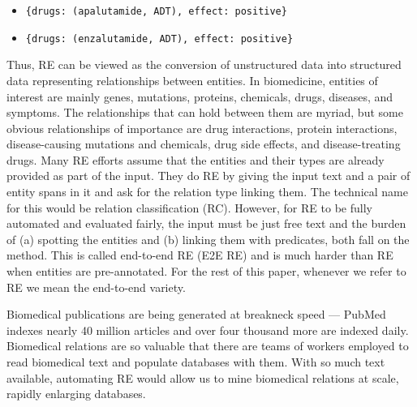\documentclass[11pt]{article}
\begin{document}
\noindent\parbox{\linewidth}{
\begin{itemize}
    \item \texttt{\{drugs: (apalutamide, ADT), effect: positive\}}
    \item \texttt{\{drugs: (enzalutamide, ADT), effect: positive\}}
\end{itemize}
} 

\noindent Thus, RE can be viewed as the conversion of unstructured data into structured data representing relationships between entities. 
In biomedicine, entities of interest are mainly genes, mutations, proteins, chemicals, drugs, diseases, and symptoms. The relationships that can hold between them are myriad, but some obvious relationships of importance are drug interactions, protein interactions, disease-causing mutations and chemicals, drug side effects, and disease-treating drugs. 
Many RE efforts assume that the entities and their types are already provided as part of the input. They do RE by giving the input text and a pair of entity spans in it and ask for the relation type linking them. The technical name for this would be relation classification (RC).  However, for RE to be fully automated and evaluated fairly, the input must be just free text and the burden of (a) spotting the entities and (b) linking them with predicates, both fall on the method. This is called end-to-end RE (E2E RE) and is much harder than RE when entities are pre-annotated. For the rest of this paper, whenever we refer to RE we mean the end-to-end variety. 

Biomedical publications  are being generated at breakneck speed --- PubMed indexes nearly 40 million articles and over four thousand more are indexed daily. Biomedical relations are so valuable that there are teams of workers employed to read biomedical text and populate databases with them. With so much text available, automating RE would allow us to mine biomedical relations at scale, rapidly enlarging databases. 
\end{document}
